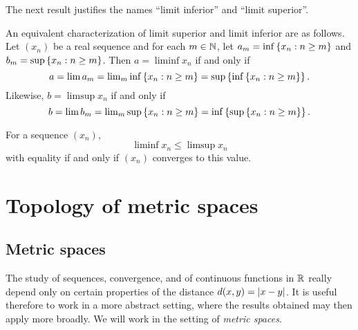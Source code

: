 \documentclass{book}
\begin{document}
The next result justifies the names ``limit inferior'' and ``limit superior''.
\begin{prop}
An equivalent characterization of limit superior and limit inferior are as follows. Let $(x_n)$ be a real sequence
and for each $m \in \mathbb{N}$, let $a_m = \inf \left\{ x_n : n \geq m \right\}$ and $b_m = \sup \left\{ x_n : n \geq m \right\}$. Then
$a = \liminf x_n$ if and only if
\[
	a = \lim a_m = \textstyle \lim_m \inf \left\{ x_n : n \geq m \right\} = \sup \left\{ \inf \left\{ x_n : n \geq m \right\} \right\}.
\]
Likewise, $b = \limsup x_n$ if and only if
\[
	b = \lim b_m = \textstyle \lim_m \sup \left\{ x_n : n \geq m \right\} = \inf \left\{ \sup \left\{ x_n : n \geq m \right\} \right\}.
\]
\label{P:limsup_alt}
\end{prop}


\begin{prop}
For a sequence $(x_n)$,
\[
	\liminf x_n \leq \limsup x_n
\]
with equality if and only if $(x_n)$ converges to this value.
\label{P:limsup_ineq}
\end{prop}


\chapter{Topology of metric spaces} \label{Ch:metric}
\section{Metric spaces} \label{S:metric}
The study of sequences, convergence, and of continuous functions in $\mathbb{R}$
really depend only on certain properties of the distance $d(x,y) = \lvert x - y\rvert$. It
is useful therefore to work in a more abstract setting, where the results
obtained may then apply more broadly. We will work in the setting of {\em metric spaces}.
\end{document}
